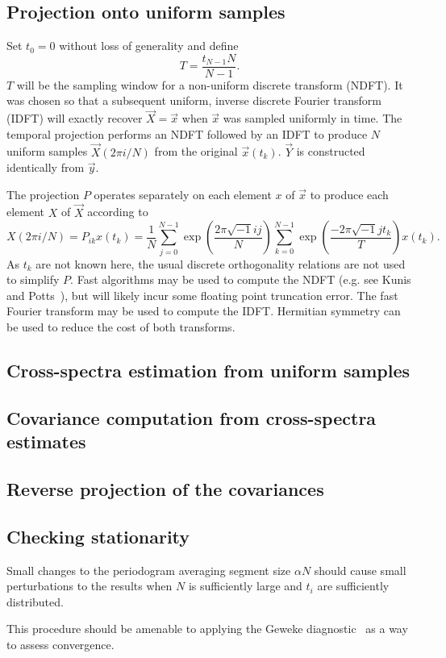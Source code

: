 \documentclass[letterpaper,11pt,nointlimits,reqno]{amsart}
\begin{document}
\subsection*{Projection onto uniform samples}

Set $t_0=0$ without loss of generality and define
$$
T = \frac{t_{N-1} N}{N-1}.
$$
$T$ will be the sampling window for a non-uniform discrete transform (NDFT).
It was chosen so that a subsequent uniform, inverse discrete Fourier transform
(IDFT) will exactly recover $\vec{X}=\vec{x}$ when $\vec{x}$ was sampled
uniformly in time.  The temporal projection performs an NDFT followed by an
IDFT to produce $N$ uniform samples $\vec{X}\left(2\pi{}i/N\right)$ from the
original $\vec{x}\left(t_k\right)$.  $\vec{Y}$ is constructed identically from
$\vec{y}$.

The projection $P$ operates separately on each element $x$ of $\vec{x}$
to produce each element $X$ of $\vec{X}$ according to
$$
    X\left(2\pi{}i/N\right)
    =
    P_{ik} x\left(t_k\right)
    =
    \frac{1}{N}
    \sum_{j=0}^{N-1} \exp\left(\frac{ 2\pi\sqrt{-1} i j   }{N} \right)
    \sum_{k=0}^{N-1} \exp\left(\frac{-2\pi\sqrt{-1} j t_k }{T} \right)
    x\left(t_k\right)
.
$$
As $t_k$ are not known here, the usual discrete orthogonality relations are not
used to simplify $P$.  Fast algorithms may be used to compute the NDFT (e.g.
see Kunis and Potts~\cite{Kunis2008Time}), but will likely incur some floating
point truncation error.  The fast Fourier transform may be used to compute the
IDFT.  Hermitian symmetry can be used to reduce the cost of both transforms.

\subsection*{Cross-spectra estimation from uniform samples}

\subsection*{Covariance computation from cross-spectra estimates}

\subsection*{Reverse projection of the covariances}

\subsection*{Checking stationarity}

Small changes to the periodogram averaging segment size $\alpha N$
should cause small perturbations to the results when $N$ is sufficiently
large and $t_i$ are sufficiently distributed.

This procedure should be amenable to applying the Geweke
diagnostic~\cite{Geweke1992Evaluating} as a way to assess convergence.




\end{document}
